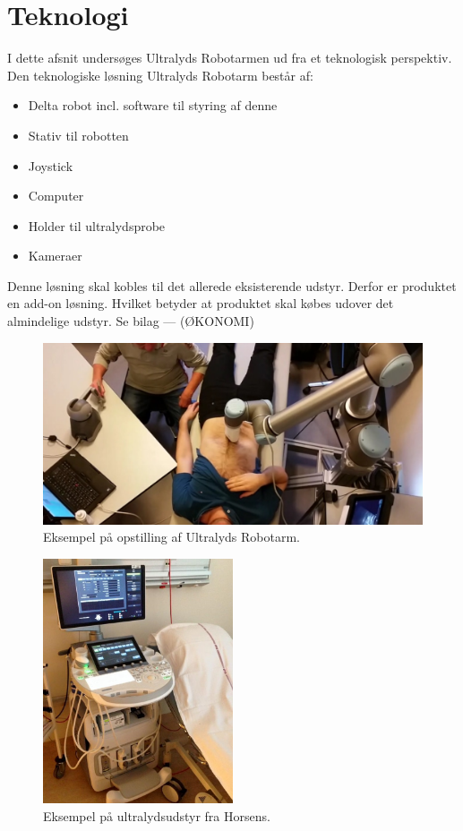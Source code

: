 \chapter{Teknologi}
I dette afsnit undersøges Ultralyds Robotarmen ud fra et teknologisk perspektiv. Den teknologiske løsning Ultralyds Robotarm består af:
\begin{itemize}
\item  Delta robot incl. software til styring af denne
\item Stativ til robotten
\item Joystick
\item Computer
\item Holder til ultralydsprobe
\item Kameraer
\end{itemize}
Denne løsning skal kobles til det allerede eksisterende udstyr. Derfor er produktet en add-on løsning. Hvilket betyder at produktet skal købes udover det almindelige udstyr. Se bilag --- (ØKONOMI)
\begin{figure}[h!]\centering
	\includegraphics[width = 1.0\textwidth]{Figurer/ergonomiskLosning.jpg}
	\caption{Eksempel på opstilling af Ultralyds Robotarm.}
	\label{ergonomiskLosning}
\end{figure}

\begin{figure}[h!]\centering
	\includegraphics[width = 0.5\textwidth]{Figurer/udstyrHorsens.jpg}
	\caption{Eksempel på ultralydsudstyr fra Horsens.}
	\label{udstyrHorsens}
\end{figure}


